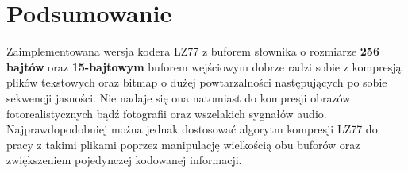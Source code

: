 \documentclass{article}
\begin{document}
\section{Podsumowanie}
Zaimplementowana wersja kodera LZ77 z buforem słownika o rozmiarze \textbf{256 bajtów} oraz \textbf{15-bajtowym} buforem wejściowym dobrze radzi sobie z kompresją plików tekstowych oraz bitmap o dużej powtarzalności następujących po sobie sekwencji jasności. Nie nadaje się ona natomiast do kompresji obrazów fotorealistycznych bądź fotografii oraz wszelakich sygnałów audio. Najprawdopodobniej można jednak dostosować algorytm kompresji LZ77 do pracy z takimi plikami poprzez manipulację wielkością obu buforów oraz zwiększeniem pojedynczej kodowanej informacji. 
\end{document}
